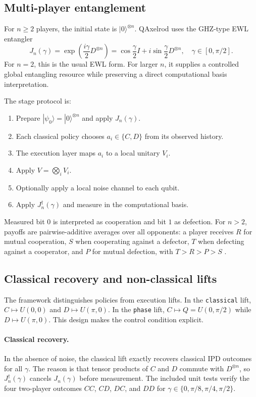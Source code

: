\documentclass[11pt]{article}
\begin{document}
\subsection{Multi-player entanglement}
For $n\geq2$ players, the initial state is $|0\rangle^{\otimes n}$. QAxelrod uses the GHZ-type EWL entangler
\begin{equation}
J_n(\gamma)=\exp\left(\frac{i\gamma}{2}D^{\otimes n}\right)
=\cos\frac{\gamma}{2}I+i\sin\frac{\gamma}{2}D^{\otimes n},
\quad \gamma\in[0,\pi/2].
\end{equation}
For $n=2$, this is the usual EWL form. For larger $n$, it supplies a controlled global entangling resource while preserving a direct computational basis interpretation.

The stage protocol is:
\begin{enumerate}[leftmargin=*]
\item Prepare $|\psi_0\rangle=|0\rangle^{\otimes n}$ and apply $J_n(\gamma)$.
\item Each classical policy chooses $a_i\in\{C,D\}$ from its observed history.
\item The execution layer maps $a_i$ to a local unitary $V_i$.
\item Apply $V=\bigotimes_i V_i$.
\item Optionally apply a local noise channel to each qubit.
\item Apply $J_n^\dagger(\gamma)$ and measure in the computational basis.
\end{enumerate}
Measured bit $0$ is interpreted as cooperation and bit $1$ as defection. For $n>2$, payoffs are pairwise-additive averages over all opponents: a player receives $R$ for mutual cooperation, $S$ when cooperating against a defector, $T$ when defecting against a cooperator, and $P$ for mutual defection, with $T>R>P>S$ \cite{Nowak2006}.

\subsection{Classical recovery and non-classical lifts}
The framework distinguishes policies from execution lifts. In the \texttt{classical} lift, $C\mapsto U(0,0)$ and $D\mapsto U(\pi,0)$. In the \texttt{phase} lift, $C\mapsto Q=U(0,\pi/2)$ while $D\mapsto U(\pi,0)$. This design makes the control condition explicit.

\paragraph{Classical recovery.}
In the absence of noise, the classical lift exactly recovers classical IPD outcomes for all $\gamma$. The reason is that tensor products of $C$ and $D$ commute with $D^{\otimes n}$, so $J_n^\dagger(\gamma)$ cancels $J_n(\gamma)$ before measurement. The included unit tests verify the four two-player outcomes $CC$, $CD$, $DC$, and $DD$ for $\gamma\in\{0,\pi/8,\pi/4,\pi/2\}$.
\end{document}
